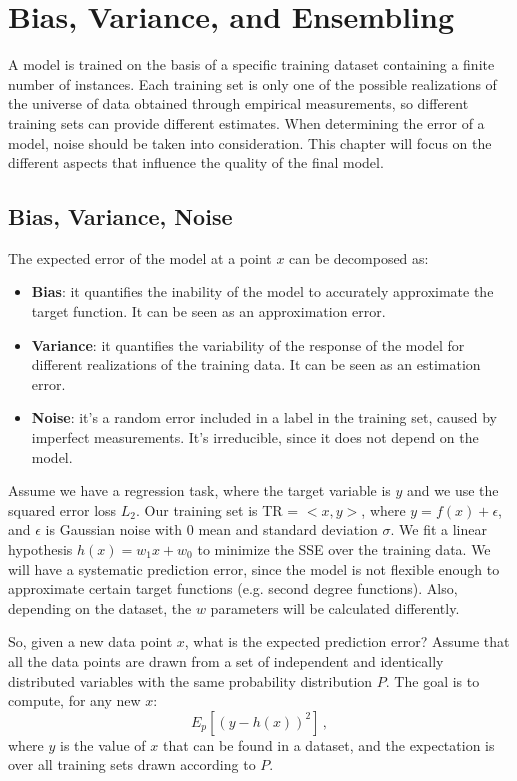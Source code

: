 \chapter{Bias, Variance, and Ensembling}

A model is trained on the basis of a specific training dataset containing a finite number of instances. Each training set is only one of the possible realizations of the universe of data obtained through empirical measurements, so different training sets can provide different estimates. When determining the error of a model, noise should be taken into consideration. This chapter will focus on the different aspects that influence the quality of the final model.

\section{Bias, Variance, Noise}

The expected error of the model at a point $x$ can be decomposed as:
\begin{itemize}
    \item \textbf{Bias}: it quantifies the inability of the model to accurately approximate the target function. It can be seen as an approximation error.

    \item \textbf{Variance}: it quantifies the variability of the response of the model for different realizations of the training data. It can be seen as an estimation error.

    \item \textbf{Noise}: it's a random error included in a label in the training set, caused by imperfect measurements. It's irreducible, since it does not depend on the model.
\end{itemize}

Assume we have a regression task, where the target variable is $y$ and we use the squared error loss $L_2$. Our training set is TR = $< x, y >$, where $y = f(x) + \epsilon$, and $\epsilon$ is Gaussian noise with 0 mean and standard deviation $\sigma$. We fit a linear hypothesis $h(x) = w_1x + w_0$ to minimize the SSE over the training data. We will have a systematic prediction error, since the model is not flexible enough to approximate certain target functions (e.g. second degree functions). Also, depending on the dataset, the $w$ parameters will be calculated differently.

So, given a new data point $x$, what is the expected prediction error? Assume that all the data points are drawn from a set of independent and identically distributed variables with the same probability distribution $P$. The goal is to compute, for any new $x$:
\begin{equation*}
    E_p [(y-h(x))^2] \,,
\end{equation*}
where $y$ is the value of $x$ that can be found in a dataset, and the expectation is over all training sets drawn according to $P$.

